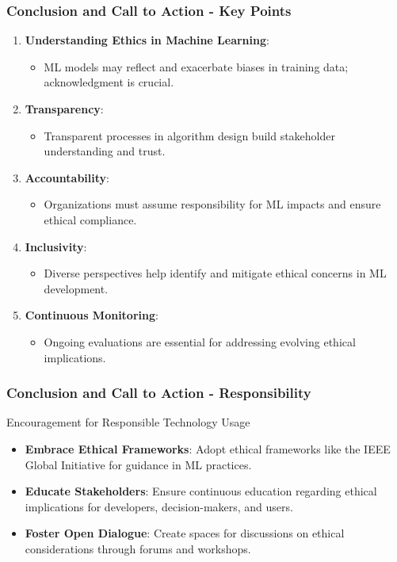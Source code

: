 \documentclass[aspectratio=169]{beamer}
\begin{document}
\begin{frame}[fragile]
  \frametitle{Conclusion and Call to Action - Key Points}
  \begin{enumerate}
    \item \textbf{Understanding Ethics in Machine Learning}:
    \begin{itemize}
      \item ML models may reflect and exacerbate biases in training data; acknowledgment is crucial.
    \end{itemize}
  
    \item \textbf{Transparency}:
    \begin{itemize}
      \item Transparent processes in algorithm design build stakeholder understanding and trust.
    \end{itemize}

    \item \textbf{Accountability}:
    \begin{itemize}
      \item Organizations must assume responsibility for ML impacts and ensure ethical compliance.
    \end{itemize}

    \item \textbf{Inclusivity}:
    \begin{itemize}
      \item Diverse perspectives help identify and mitigate ethical concerns in ML development.
    \end{itemize}

    \item \textbf{Continuous Monitoring}:
    \begin{itemize}
      \item Ongoing evaluations are essential for addressing evolving ethical implications.
    \end{itemize}
  \end{enumerate}
\end{frame}

\begin{frame}[fragile]
  \frametitle{Conclusion and Call to Action - Responsibility}
  \begin{block}{Encouragement for Responsible Technology Usage}
    \begin{itemize}
      \item \textbf{Embrace Ethical Frameworks}: Adopt ethical frameworks like the IEEE Global Initiative for guidance in ML practices.
      \item \textbf{Educate Stakeholders}: Ensure continuous education regarding ethical implications for developers, decision-makers, and users.
      \item \textbf{Foster Open Dialogue}: Create spaces for discussions on ethical considerations through forums and workshops.
    \end{itemize}
  \end{block}
\end{frame}
\end{document}
